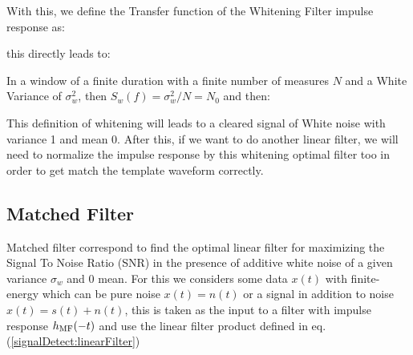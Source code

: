 
\newp With this, we define the Transfer function of the Whitening Filter impulse response as:


\newp this directly leads to:


\newp In a window of a finite duration with a finite number of measures $N$ and a White Variance of $\sigma_w^{2}$, then $S_w(f) = \sigma_w^{2}/N = N_0$ and then:


\newp This definition of whitening will leads to a cleared signal of White noise with variance 1 and mean 0. After this, if we want to do another linear filter, we will need to normalize the impulse response by this whitening optimal filter too in order to get match the template waveform correctly.

\subsection{Matched Filter}{\label{sec:signalDetect::ssec:MF}}
\newp Matched filter correspond to find the optimal linear filter for maximizing the Signal To Noise Ratio (SNR) in the presence of additive white noise of a given variance $\sigma_w$ and 0 mean. For this we considers some data $x(t)$ with finite-energy which can be pure noise $x(t) = n(t)$ or a signal in addition to noise $x(t) = s(t) + n(t)$, this is taken as the input to a filter with impulse response $h_{\text{MF}}(-t)$ and use the linear filter product defined in eq. (\ref{signalDetect:linearFilter})

